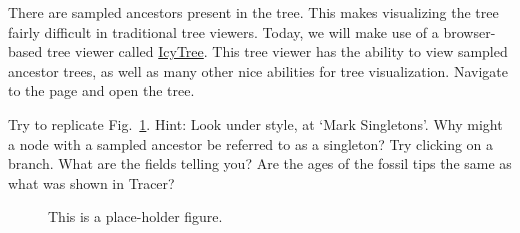 There are sampled ancestors present in the tree. This makes visualizing the tree fairly difficult in traditional tree viewers. Today, we will make use of a browser-based tree viewer called \href{http://tgvaughan.github.io/icytree/}{IcyTree}. This tree viewer has the ability to view sampled ancestor trees, as well as many other nice abilities for tree visualization. Navigate to the page and open the tree. \par


Try to replicate Fig.\ \ref{fig:IcyTreeSumm}. Hint: Look under style, at `Mark Singletons'. Why might a node with a sampled ancestor be referred to as a singleton? Try clicking on a branch. What are the fields telling you? Are the ages of the fossil tips the same as what was shown in Tracer? 

\begin{figure}[h!]
\centering
{}
\caption{\small This is a place-holder figure.}
\label{fig:IcyTreeSumm}
\end{figure}





